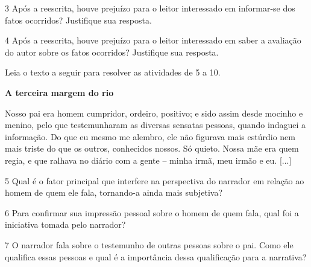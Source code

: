 \num{3} Após a reescrita, houve prejuízo para o leitor interessado em
informar-se dos fatos ocorridos? Justifique sua resposta.


\num{4} Após a reescrita, houve prejuízo para o leitor interessado em
saber a avaliação do autor sobre os fatos ocorridos? Justifique sua
resposta.


Leia o texto a seguir para resolver as atividades de 5 a 10.

\begin{myquote}
\centering\textbf{A terceira margem do rio}


Nosso pai era homem cumpridor, ordeiro, positivo; e sido assim desde
mocinho e menino, pelo que testemunharam as diversas sensatas pessoas,
quando indaguei a informação. Do que eu mesmo me alembro, ele não
figurava mais estúrdio nem mais triste do que os outros, conhecidos
nossos. Só quieto. Nossa mãe era quem regia, e que ralhava no diário com
a gente -- minha irmã, meu irmão e eu. [...]

\end{myquote}

\num{5} Qual é o fator principal que interfere na perspectiva do
narrador em relação ao homem de quem ele fala, tornando-a ainda mais
subjetiva?


\num{6} Para confirmar sua impressão pessoal sobre o homem de quem fala,
qual foi a iniciativa tomada pelo narrador?


\num{7} O narrador fala sobre o testemunho de outras pessoas sobre o pai. Como ele qualifica essas pessoas e qual é a importância dessa qualificação para a narrativa?

